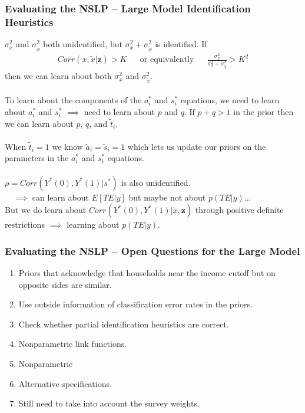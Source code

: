 \documentclass[xcolor=dvipsnames]{beamer}
\begin{document}
\begin{frame}
\frametitle{Evaluating the NSLP -- Large Model Identification Heuristics}
$\sigma_x^2$ and $\sigma_{\tilde{x}}^2$ both unidentified, but $\sigma_x^2 + \sigma_{\tilde{x}}^2$ is identified. \pause If 
\begin{align*}
Corr(x,\tilde{x}|\bm{z})>K&&\mbox{or equivalently}&&\frac{\sigma_x^2}{\sigma_x^2 + \sigma_{\tilde{x}}^2} > K^2
\end{align*}
then we can learn about both $\sigma_x^2$ and $\sigma_{\tilde{x}}^2$. \\~\\

\pause To learn about the components of the $a_i^*$ and $s_i^*$ equations, we need to learn about $a_i^*$ and $s_i^*$ $\implies$ need to learn about $p$ and $q$. \pause If $p + q > 1$ in the prior then we can learn about $p$, $q$, and $\tilde{t}_i$.\\~\\

\pause When $\tilde{t}_i=1$ we know $\tilde{a}_i=\tilde{s}_i=1$ which lets us update our priors on the parameters in the $a^*_i$ and $s_i^*$ equations.\\~\\

\pause $\rho=Corr(Y^*(0),Y^*(1)|s^*)$ is also unidentified.\\
\pause\ \ $\implies$ can learn about $E[TE|y]$ but maybe not about $p(TE|y)$...\\
\pause But we do learn about $Corr(Y^*(0),Y^*(1)|\tilde{x},\bm{z})$ through positive definite restrictions $\implies$ learning about $p(TE|y)$.

\end{frame}

\begin{frame}
\frametitle{Evaluating the NSLP -- Open Questions for the Large Model}
\begin{enumerate}
\item Priors that acknowledge that households near the income cutoff but on opposite sides are similar.
\item Use outside information of classification error rates in the priors.
\item Check whether partial identification heuristics are correct.
\item Nonparametric link functions.
\item Nonparametric
\item Alternative specifications.
\item Still need to take into account the survey weights.
\end{enumerate}
\end{frame}



\end{document}
